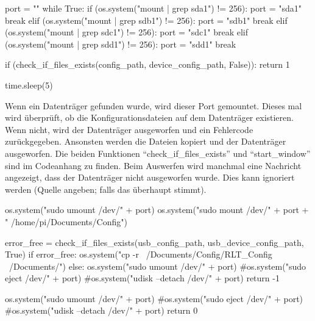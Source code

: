 \begin{pythoncode}
	port = ""
	while True:
		if (os.system("mount | grep sda1") != 256):
			port = "sda1"
			break
		elif (os.system("mount | grep sdb1") != 256):
			port = "sdb1"
			break
		elif (os.system("mount | grep sdc1") != 256):
			port = "sdc1"
			break
		elif (os.system("mount | grep sdd1") != 256):
			port = "sdd1"
			break
		
		if (check_if_files_exists(config_path, device_config_path, False)):
			return 1
			
		time.sleep(5)
\end{pythoncode}

Wenn ein Datenträger gefunden wurde, wird dieser Port gemountet. Dieses mal wird überprüft, ob die Konfigurationsdateien auf dem Datenträger existieren. Wenn nicht, wird der Datenträger ausgeworfen und ein Fehlercode zurückgegeben. Ansonsten werden die Dateien kopiert und der Datenträger ausgeworfen. Die beiden Funktionen \enquote{check\_if\_files\_exists} und \enquote{start\_window} sind im Codeanhang zu finden. Beim Auswerfen wird manchmal eine Nachricht angezeigt, dass der Datenträger nicht ausgeworfen wurde. Dies kann ignoriert werden (Quelle angeben; falls das überhaupt stimmt).

\begin{pythoncode}
	os.system("sudo umount /dev/" + port)
	os.system("sudo mount /dev/" + port + " /home/pi/Documents/Config")
	
	error_free = check_if_files_exists(usb_config_path, usb_device_config_path, True)
	if error_free:
		os.system("cp -r ~/Documents/Config/RLT_Config ~/Documents/")
	else:
		os.system("sudo umount /dev/" + port)
		#os.system("sudo eject /dev/" + port) 
		#os.system("udisk --detach /dev/" + port)
		return -1
		
	os.system("sudo umount /dev/" + port)
	#os.system("sudo eject /dev/" + port) 
	#os.system("udisk --detach /dev/" + port)
	return 0
\end{pythoncode}